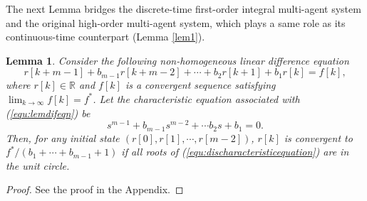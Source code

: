 \documentclass[12pt,draftcls,onecolumn]{IEEEtran}
\newtheorem{lem}{Lemma}
\begin{document}
The next Lemma bridges the discrete-time first-order integral multi-agent system and the original high-order multi-agent system, which plays a same role as its continuous-time counterpart (Lemma \ref{lem1}).
\begin{lem}\label{lem:discrete}
Consider the following non-homogeneous linear difference equation
\begin{equation}\label{equ:disdifeqn}
r[k+m-1] + b_{m-1}r[k+m-2] + \cdots + b_2r[k+1] + b_1r[k] = f[k],
\end{equation}
where $r[k] \in \mathbb{R}$ and $f[k]$ is a convergent sequence satisfying $\lim_{k\to\infty}f[k] = f^*$. Let the characteristic equation associated with (\ref{equ:lemdifeqn}) be
\begin{equation}\label{equ:discharacteristicequation}
s^{m-1} + b_{m-1}s^{m-2} + \cdots b_2s + b_1 = 0.
\end{equation}
Then,
for any initial state $(r[0],r[1],\cdots,r[m-2])$, $r[k]$ is convergent to $f^*/(b_1+\cdots+b_{m-1}+1)$ if all roots of (\ref{equ:discharacteristicequation}) are in the unit circle.
\end{lem}
\begin{proof}
See the proof in the Appendix.
\end{proof}
\end{document}
